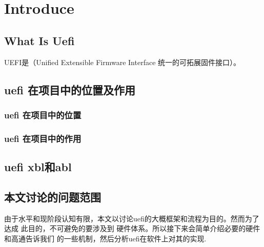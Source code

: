 \chapter{Introduce}



\section{What Is Uefi}

UEFI是（Unified Extensible Firmware Interface  统一的可拓展固件接口）。



\section{uefi 在项目中的位置及作用}


\subsection{uefi 在项目中的位置}


\subsection{uefi 在项目中的作用}



\section{uefi xbl和abl}




\section{本文讨论的问题范围}

由于水平和现阶段认知有限，本文以讨论uefi的大概框架和流程为目的。然而为了达成
此目的，不可避免的要涉及到 硬件体系。所以接下来会简单介绍必要的硬件和高通告诉我们
的一些机制，然后分析uefi在软件上对其的实现.


